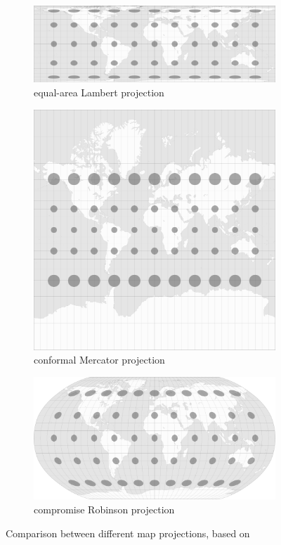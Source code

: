 \begin{figure}[ht]
  \vspace{1.5em}
  \centering
  \begin{subfigure}{0.59\textwidth}
    \centering
    \includegraphics[width=0.9\linewidth]{graphics/basics/hgis/projection_distortion_lambert.png}
    \caption{equal-area Lambert projection}
  \end{subfigure}
  \begin{subfigure}{0.39\textwidth}
    \centering
    \includegraphics[width=0.9\linewidth]{graphics/basics/hgis/projection_distortion_mercator.png}
    \caption{conformal Mercator projection}
    \vspace{1em}
  \end{subfigure}
  \begin{subfigure}{0.55\textwidth}
    \centering
    \includegraphics[width=0.9\linewidth]{graphics/basics/hgis/projection_distortion_robinson.png}
    \caption{compromise Robinson projection}
  \end{subfigure}
  \label{fig:map_projections}
  \caption{Comparison between different map projections, based on \cite{mapProjections}}
\end{figure}

